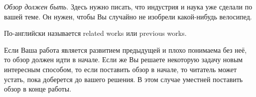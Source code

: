 
\label{sec:relatedworks}
\emph{Обзор должен быть.} Здесь нужно писать, что индустрия и наука уже сделали по вашей теме. Он нужен, чтобы Вы случайно не изобрели какой-нибудь велосипед.

По-английски называется related works или previous works.

Если Ваша работа является развитием предыдущей и плохо понимаема без неё, то обзор должен идти в начале. Если же Вы решаете некоторую задачу новым интересным способом, то если поставить обзор в начале, то читатель может устать, пока доберется до вашего решения. В этом случае уместней поставить обзор в конце работы.



